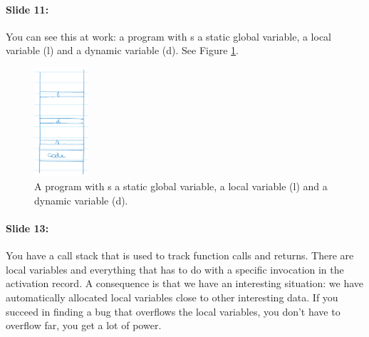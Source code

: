 \documentclass[10pt,a4paper]{report}
\begin{document}
\paragraph{Slide 11:} You can see this at work: a program with s a static global variable, a local variable (l) and a dynamic variable (d). See Figure \ref{les2_02}.

\begin{figure}[ht!]
\centering
\includegraphics[width=20mm]{Les2_02.png}
\caption{A program with s a static global variable, a local variable (l) and a dynamic variable (d).} 
\label{les2_02}
\end{figure}

\paragraph{Slide 13:} You have a call stack that is used to track function calls and returns. There are local variables and everything that has to do with a specific invocation in the activation record. A consequence is that we have an interesting situation: we have automatically allocated local variables close to other interesting data. If you succeed in finding a bug that overflows the local variables, you don't have to overflow far, you get a lot of power.
\end{document}
